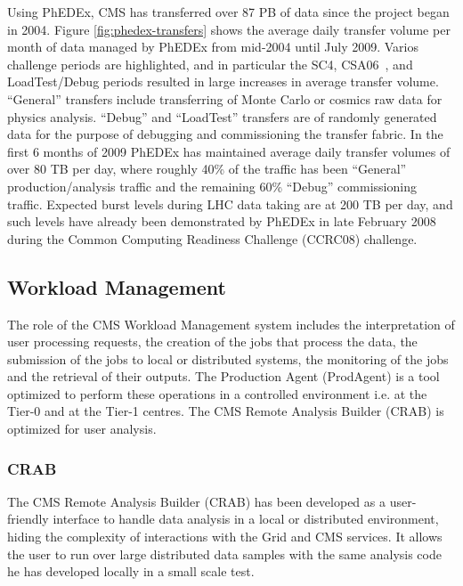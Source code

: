 Using PhEDEx, CMS has transferred over 87 PB of data since the project 
began in 2004.  Figure \ref{fig:phedex-transfers} shows the average
daily transfer volume per month of data managed by PhEDEx from
mid-2004 until July 2009.  Varios challenge periods are highlighted,
and in particular the SC4, CSA06~\cite{RefPastExp}, and LoadTest/Debug periods resulted
in large increases in average transfer volume.  ``General'' transfers
include transferring of Monte Carlo or cosmics raw data for physics
analysis.  ``Debug'' and ``LoadTest'' transfers are of randomly
generated data for the purpose of debugging and commissioning the
transfer fabric.  In the first 6 months of 2009 PhEDEx has maintained
average daily transfer volumes of over 80 TB per day, where roughly
40\% of the traffic has been ``General'' production/analysis traffic
and the remaining 60\% ``Debug'' commissioning traffic.  Expected
burst levels during LHC data taking are at 200 TB per day, and such
levels have already been demonstrated by PhEDEx in late February 2008
during the Common Computing Readiness Challenge (CCRC08) challenge.

\subsection{Workload Management}
The role of the CMS Workload Management system includes the interpretation of user processing requests, the creation of the jobs that process the data, the submission of the jobs to local or distributed systems, the monitoring of the jobs and the retrieval of their outputs. The Production Agent (ProdAgent)\cite{RefPA} is a tool optimized to perform these operations in a controlled environment i.e. at the Tier-0 and at the Tier-1 centres. The CMS Remote Analysis Builder (CRAB) is optimized for user analysis.

%
\label{sec:3_2}
\subsubsection{CRAB}
\label{sec:CRAB}
The CMS Remote Analysis Builder (CRAB)\cite{RefCRAB} has been developed as a user-friendly interface to handle data analysis in a local or distributed environment, hiding the complexity of interactions with the Grid and CMS services.
It allows the user to run over large distributed data samples with the same analysis code he has developed 
locally in a small scale test. 

